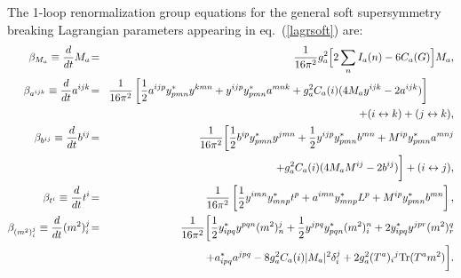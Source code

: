 \documentclass[12pt]{article}
\def\beq{\begin{eqnarray}}
\def\eeq{\end{eqnarray}}
\begin{document}
The 1-loop renormalization group equations for the
general soft supersymmetry breaking Lagrangian parameters appearing in
eq.~(\ref{lagrsoft}) are:
\beq
\beta_{M_a} \equiv 
{d\over dt} M_a 
\!&=&\! 
{1\over 16\pi^2} g_a^2 \Bigl [2 \sum_n I_a(n) - 6 C_a(G) \Bigr ] M_a
,
\\
\beta_{a^{ijk}} \equiv \frac{d}{dt} a^{ijk}
\!&=&\!
\frac{1}{16 \pi^2} \left [
\frac{1}{2} a^{ijp} y^*_{pmn} y^{kmn} 
+ y^{ijp} y^*_{pmn} a^{mnk}
+ g_a^2 C_a(i) (4 M_a y^{ijk}  - 2 a^{ijk}) 
\right ]\phantom{xxxx}
\nonumber \\ &&
+ (i \leftrightarrow k)
+ (j \leftrightarrow k)
,\\
\beta_{b^{ij}} \equiv \frac{d}{dt} b^{ij}
\!&=&\!
\frac{1}{16 \pi^2} 
\biggl [
\frac{1}{2} b^{ip} y^*_{pmn} y^{jmn} 
+ \frac{1}{2} y^{ijp} y^*_{pmn} b^{mn} 
+ M^{ip} y^*_{pmn} a^{mnj}
\nonumber \\ &&
+  g_a^2 C_a(i) (4 M_a M^{ij}  - 2 b^{ij})
\biggr ]
+ (i \leftrightarrow j) 
,
\\
\beta_{t^{i}} \equiv \frac{d}{dt} t^{i}
\!&=&\!
\frac{1}{16 \pi^2} \left [
\frac{1}{2} y^{imn} y^*_{mnp} t^p 
+ a^{imn} y^*_{mnp} L^p
+ M^{ip} y^*_{pmn} b^{mn} 
\right ],
\\
\beta_{(m^2)_{i}^j} \equiv \frac{d}{dt} (m^2)_{i}^j
\!&=&\!
\frac{1}{16 \pi^2} \biggl [
\frac{1}{2} y_{ipq}^* y^{pqn} (m^2)_n^j
+ \frac{1}{2} y^{jpq} y_{pqn}^* (m^2)_i^n
+ 2 y^*_{ipq} y^{jpr} (m^2)_r^q
\nonumber \\ &&
+ a^*_{ipq} a^{jpq}
- 8 g_a^2 C_a(i) |M_a|^2 \delta_i^j
+ 2 g_a^2 (T^a)_i{}^j
{\rm Tr}(T^a m^2)
\biggr ]
.
\eeq
\end{document}

